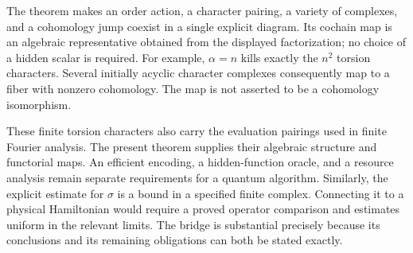 The theorem makes an order action, a character pairing, a variety of
complexes, and a cohomology jump coexist in a single explicit diagram.
Its cochain map is an algebraic representative obtained from the displayed
factorization; no choice of a hidden scalar is required.  For example,
$\alpha=n$ kills exactly the $n^2$ torsion characters.  Several initially
acyclic character complexes consequently map to a fiber with nonzero
cohomology.  The map is not asserted to be a cohomology isomorphism.

These finite torsion characters also carry the evaluation pairings used in
finite Fourier analysis.  The present theorem supplies their algebraic
structure and functorial maps.  An efficient encoding, a hidden-function
oracle, and a resource analysis remain separate requirements for a quantum
algorithm.  Similarly, the explicit estimate for $\sigma$ is a bound in
a specified finite complex.  Connecting it to a physical Hamiltonian would
require a proved operator comparison and estimates uniform in the relevant
limits.  The bridge is substantial precisely because its conclusions and
its remaining obligations can both be stated exactly.
